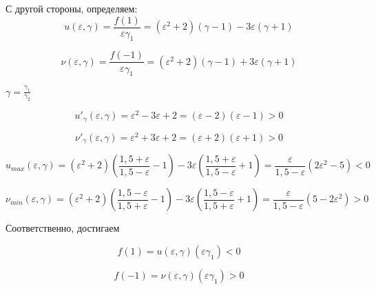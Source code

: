С другой стороны, определяем:
\begin{equation}
\label{eq:equation48}
u(\varepsilon, \gamma) = \frac{f(1)}{\varepsilon \gamma_1} = (\varepsilon ^2 + 2) (\gamma - 1) - 3\varepsilon (\gamma + 1)
\end{equation}

\begin{equation}
\label{eq:equation49}
\nu(\varepsilon, \gamma) = \frac{f(-1)}{\varepsilon \gamma_1} = (\varepsilon ^2 + 2) (\gamma - 1) + 3\varepsilon (\gamma + 1)
\end{equation}

$\gamma = \frac{\gamma_1}{\gamma_2}$

\begin{equation}
\label{eq:equation50}
u'_{\gamma}(\varepsilon, \gamma) = \varepsilon^2 - 3\varepsilon + 2 = (\varepsilon - 2)(\varepsilon -1) >0
\end{equation}

\begin{equation}
\label{eq:equation51}
{\nu}'_\gamma
(\varepsilon, \gamma) = \varepsilon^2 + 3\varepsilon + 2 = (\varepsilon + 2)(\varepsilon + 1) >0
% 
\end{equation}


\begin{equation}
\label{eq:equation52}
u _{max}(\varepsilon, \gamma) =
\left( {\varepsilon^2+2} \right) 
\left( {\frac{1,5+\varepsilon}{1,5-\varepsilon}-1} \right) - 3 \varepsilon 
\left( {\frac{1,5+\varepsilon}{1,5-\varepsilon}+1} \right) = \frac{\varepsilon}{1,5-\varepsilon}(2\varepsilon^2 - 5) < 0
\end{equation}

\begin{equation}
\label{eq:equation53}
\nu _{min}(\varepsilon, \gamma) =
\left( {\varepsilon^2+2} \right) 
\left( {\frac{1,5-\varepsilon}{1,5+\varepsilon}-1} \right) - 3 \varepsilon 
\left( {\frac{1,5-\varepsilon}{1,5+\varepsilon}+1} \right) = \frac{\varepsilon}{1,5-\varepsilon}(5-2\varepsilon^2) > 0
\end{equation}

Соответственно, достигаем

\begin{equation}
\label{eq:equation54}
f(1) = u(\varepsilon, \gamma)(\varepsilon \gamma_1) <0
\end{equation}

\begin{equation}
\label{eq:equation55}
f(-1) = \nu(\varepsilon, \gamma)(\varepsilon \gamma_1) > 0
\end{equation}

